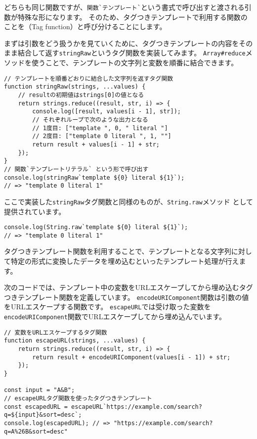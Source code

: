 どちらも同じ関数ですが、\texttt{関数}\lstinline{`}\texttt{テンプレート}\lstinline{`}という書式で呼び出すと渡される引数が特殊な形になります。
そのため、タグつきテンプレートで利用する関数のことを\textbf{}（Tag
function）と呼び分けることにします。

まずは引数をどう扱うかを見ていくために、タグつきテンプレートの内容をそのまま結合して返す\texttt{stringRaw}というタグ関数を実装してみます。
\texttt{Array\#reduce}メソッドを使うことで、テンプレートの文字列と変数を順番に結合できます。

\begin{lstlisting}
// テンプレートを順番どおりに結合した文字列を返すタグ関数
function stringRaw(strings, ...values) {
    // resultの初期値はstrings[0]の値となる
    return strings.reduce((result, str, i) => {
        console.log([result, values[i - 1], str]);
        // それぞれループで次のような出力となる
        // 1度目: ["template ", 0, " literal "]
        // 2度目: ["template 0 literal ", 1, ""]
        return result + values[i - 1] + str;
    }); 
}
// 関数`テンプレートリテラル` という形で呼び出す
console.log(stringRaw`template ${0} literal ${1}`); 
// => "template 0 literal 1"
\end{lstlisting}

ここで実装した\texttt{stringRaw}タグ関数と同様のものが、\texttt{String.raw}メソッド\,\protect{}\,として提供されています。

\begin{lstlisting}
console.log(String.raw`template ${0} literal ${1}`); 
// => "template 0 literal 1"
\end{lstlisting}

タグつきテンプレート関数を利用することで、テンプレートとなる文字列に対して特定の形式に変換したデータを埋め込むといったテンプレート処理が行えます。

次のコードでは、テンプレート中の変数をURLエスケープしてから埋め込むタグつきテンプレート関数を定義しています。
\texttt{encodeURIComponent}関数は引数の値をURLエスケープする関数です。
\texttt{escapeURL}では受け取った変数を\texttt{encodeURIComponent}関数でURLエスケープしてから埋め込んでいます。

\begin{lstlisting}
// 変数をURLエスケープするタグ関数
function escapeURL(strings, ...values) {
    return strings.reduce((result, str, i) => {
        return result + encodeURIComponent(values[i - 1]) + str;
    });  
}

const input = "A&B";
// escapeURLタグ関数を使ったタグつきテンプレート
const escapedURL = escapeURL`https://example.com/search?q=${input}&sort=desc`;
console.log(escapedURL); // => "https://example.com/search?q=A%26B&sort=desc"
\end{lstlisting}

